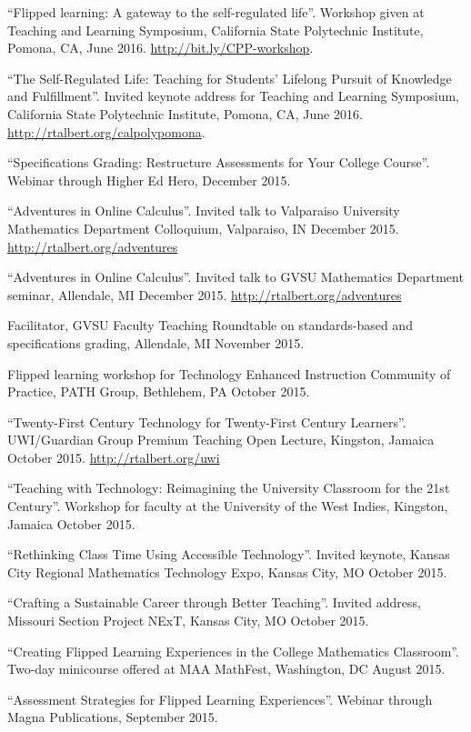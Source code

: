\documentclass[letterpaper]{article}
\renewenvironment{itemize}{
  \begin{list}{}{
    \setlength{\leftmargin}{1.5em}
	\setlength{\itemsep}{0in}
  }
}{
  \end{list}
}
\begin{document}
\begin{itemize}
	\item ``Flipped learning: A gateway to the self-regulated life''. Workshop given at Teaching and Learning Symposium, California State Polytechnic Institute, Pomona, CA, June 2016. \url{http://bit.ly/CPP-workshop}.
	\item ``The Self-Regulated Life: Teaching for Students' Lifelong Pursuit of Knowledge and Fulfillment''. Invited keynote address for Teaching and Learning Symposium, California State Polytechnic Institute, Pomona, CA, June 2016. \url{http://rtalbert.org/calpolypomona}.
	\item ``Specifications Grading: Restructure Assessments for Your College Course''. Webinar through Higher Ed Hero, December 2015.
	\item ``Adventures in Online Calculus''. Invited talk to Valparaiso University Mathematics Department Colloquium, Valparaiso, IN December 2015. \url{http://rtalbert.org/adventures}
	\item ``Adventures in Online Calculus''. Invited talk to GVSU Mathematics Department seminar, Allendale, MI December 2015. \url{http://rtalbert.org/adventures}
	\item Facilitator, GVSU Faculty Teaching Roundtable on standards-based and specifications grading, Allendale, MI November 2015.
	\item Flipped learning workshop for Technology Enhanced Instruction Community of Practice, PATH Group, Bethlehem, PA October 2015.
	\item ``Twenty-First Century Technology for Twenty-First Century Learners''. UWI/Guardian Group Premium Teaching Open Lecture, Kingston, Jamaica October 2015. \url{http://rtalbert.org/uwi}
	\item ``Teaching with Technology: Reimagining the University Classroom for the 21st Century''. Workshop for faculty at the University of the West Indies, Kingston, Jamaica October 2015.
	\item ``Rethinking Class Time Using Accessible Technology''. Invited keynote, Kansas City Regional Mathematics Technology Expo, Kansas City, MO October 2015.
	\item ``Crafting a Sustainable Career through Better Teaching''. Invited address, Missouri Section Project NExT, Kansas City, MO October 2015.
	\item ``Creating Flipped Learning Experiences in the College Mathematics Classroom''. Two-day minicourse offered at MAA MathFest, Washington, DC August 2015.
	\item ``Assessment Strategies for Flipped Learning Experiences''. Webinar through Magna Publications, September 2015.

\end{itemize}
\end{document}
